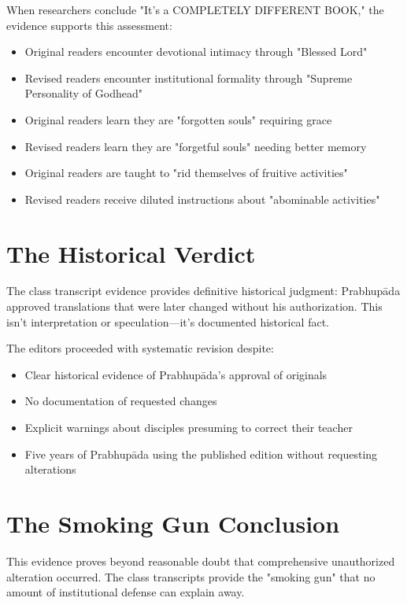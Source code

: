 \documentclass[11pt,twoside]{book}
\begin{document}
When researchers conclude "It's a COMPLETELY DIFFERENT BOOK," the evidence supports this assessment:

\begin{itemize}
\item Original readers encounter devotional intimacy through "Blessed Lord"
\item Revised readers encounter institutional formality through "Supreme Personality of Godhead"
\item Original readers learn they are "forgotten souls" requiring grace
\item Revised readers learn they are "forgetful souls" needing better memory
\item Original readers are taught to "rid themselves of fruitive activities"
\item Revised readers receive diluted instructions about "abominable activities"
\end{itemize}
\section*{The Historical Verdict}
\label{sec:orgb478fe6}

The class transcript evidence provides definitive historical judgment: Prabhupāda approved translations that were later changed without his authorization. This isn't interpretation or speculation—it's documented historical fact.

The editors proceeded with systematic revision despite:
\begin{itemize}
\item Clear historical evidence of Prabhupāda's approval of originals
\item No documentation of requested changes
\item Explicit warnings about disciples presuming to correct their teacher
\item Five years of Prabhupāda using the published edition without requesting alterations
\end{itemize}
\section*{The Smoking Gun Conclusion}
\label{sec:org26a0a1d}

This evidence proves beyond reasonable doubt that comprehensive unauthorized alteration occurred. The class transcripts provide the "smoking gun" that no amount of institutional defense can explain away.
\end{document}
